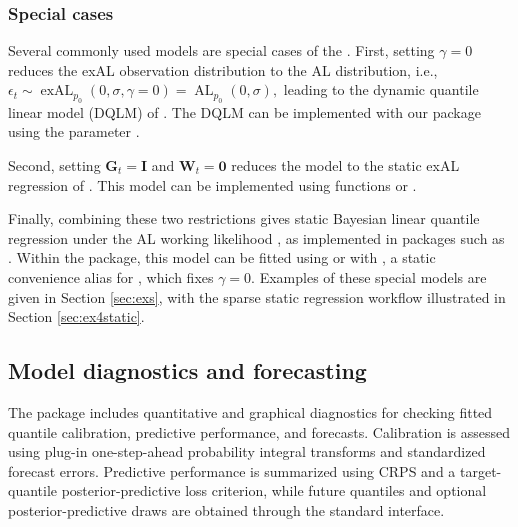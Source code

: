 \documentclass{jss}
\newcommand{\mat}[1]{\mathbf{#1}}
\newcommand{\AL}{\operatorname{AL}}
\newcommand{\exAL}{\operatorname{exAL}}
\begin{document}

\subsubsection{Special cases}
\label{sec:special}

Several commonly used models are special cases of the . First, setting $\gamma=0$ reduces the exAL observation distribution to the AL distribution, i.e.,
$\epsilon_t \sim \exAL_{p_0}(0,\sigma,\gamma=0) = \AL_{p_0}(0,\sigma),$ leading to the dynamic quantile linear model (DQLM) of \cite{gonccalves2017dynamic}. The DQLM can be implemented with our package using the parameter .

Second, setting $\mat{G}_t=\mat{I}$ and $\mat{W}_t=\mat{0}$ reduces the model to the static exAL regression of \cite{yan2025family}.
This model can be implemented using functions  or .

Finally, combining these two restrictions gives static Bayesian linear quantile regression under the AL working likelihood \cite{yu2001bayesian}, as implemented in packages such as . Within the  package, this model can be fitted using  or  with , a static convenience alias for , which fixes $\gamma=0$.
Examples of these special models are given in Section \ref{sec:exs}, with the sparse static regression workflow illustrated in Section \ref{sec:ex4static}.


\subsection{Model diagnostics and forecasting}
\label{sec:diags}


The package includes quantitative and graphical diagnostics for checking fitted quantile calibration, predictive performance, and forecasts.
Calibration is assessed using plug-in one-step-ahead probability integral transforms and standardized forecast errors. Predictive performance is summarized using CRPS and a target-quantile posterior-predictive loss criterion, while future quantiles and optional posterior-predictive draws are obtained through the standard  interface.
\end{document}
